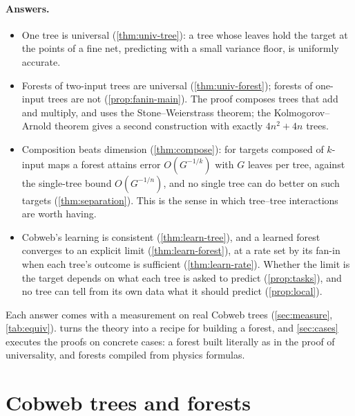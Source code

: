 \documentclass[11pt]{article}
\theoremstyle{definition}
\theoremstyle{remark}
\begin{document}
\paragraph{Answers.}
\begin{itemize}[leftmargin=*,noitemsep]
\item One tree is universal (\cref{thm:univ-tree}): a tree whose leaves hold the target at
  the points of a fine net, predicting with a small variance floor, is uniformly accurate.
\item Forests of two-input trees are universal (\cref{thm:univ-forest}); forests of
  one-input trees are not (\cref{prop:fanin-main}).  The proof composes trees that add and
  multiply, and uses the Stone--Weierstrass theorem; the Kolmogorov--Arnold theorem gives a
  second construction with exactly $4n^2+4n$ trees.
\item Composition beats dimension (\cref{thm:compose}): for targets composed of $k$-input
  maps a forest attains error $O(G^{-1/k})$ with $G$ leaves per tree, against the single-tree
  bound $O(G^{-1/n})$, and no single tree can do better on such targets
  (\cref{thm:separation}).  This is the sense in which tree--tree interactions are worth
  having.
\item Cobweb's learning is consistent (\cref{thm:learn-tree}), and a learned forest
  converges to an explicit limit (\cref{thm:learn-forest}), at a rate set by its fan-in when
  each tree's outcome is sufficient (\cref{thm:learn-rate}).  Whether the limit is the target
  depends on what each tree is asked to predict (\cref{prop:tasks}), and no tree can tell from
  its own data what it should predict (\cref{prop:local}).
\end{itemize}
Each answer comes with a measurement on real Cobweb trees (\cref{sec:measure},
\cref{tab:equiv}).   turns the theory into a recipe for building a forest,
and \cref{sec:cases} executes the proofs on concrete cases: a forest built literally as in
the proof of universality, and forests compiled from physics formulas.

\section{Cobweb trees and forests}\label{sec:forests}
\end{document}
